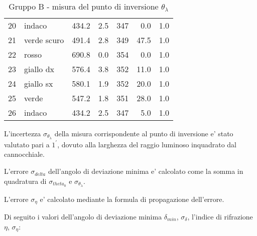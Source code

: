 \begin{table}[!htbp]
{\begin{tabular}{clcccrr}
        20  &   indaco       &   434.2  & 2.5 &  347 &   0.0   & 1.0  \\
        21  &   verde scuro  &   491.4  & 2.8 &  349 &   47.5  & 1.0  \\
        22  &   rosso        &   690.8  & 0.0 &  354 &   0.0   & 1.0  \\
        23  &   giallo dx    &   576.4  & 3.8 &  352 &   11.0  & 1.0  \\
        24  &   giallo sx    &   580.1  & 1.9 &  352 &   20.0  & 1.0  \\
        25  &   verde        &   547.2  & 1.8 &  351 &   28.0  & 1.0  \\
        26  &   indaco       &   434.2  & 2.5 &  347 &   5.0   & 1.0  \\
        \hline
    \end{tabular}
    \par}
    \caption{Gruppo B - misura del punto di inversione $\theta_{\lambda}$}
\end{table}

L'incertezza $\sigma_{\theta_{\lambda}}$ della misura corrispondente al punto di inversione e' stato valutato pari a $1^{\prime}$, dovuto alla larghezza del raggio luminoso inquadrato dal cannocchiale. 

L'errore $\sigma_{delta}$ dell'angolo di deviazione minima e' calcolato come la somma in quadratura di $\sigma_{theta_0}$ e $\sigma_{\theta_{\lambda}}$.

L'errore $\sigma_{\eta}$ e' calcolato mediante la formula di propagazione dell'errore.

Di seguito i valori dell'angolo di deviazione minima $\delta_{min}$, $\sigma_{\delta}$, l'indice di rifrazione $\eta$, $\sigma_{\eta}$:

